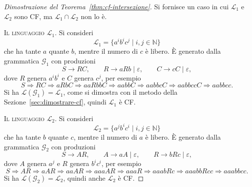 \documentclass[a4paper, 11pt, oneside]{book}
\theoremstyle{formale}
\begin{document}
    \begin{proof}[Dimostrazione del Teorema~\ref{thm:cf-intersezione}]
        Si fornisce un caso in cui $\mathcal{L}_1$ e $\mathcal{L}_2$ sono CF, ma
        $\mathcal{L}_1 \cap \mathcal{L}_2$ non lo \`e.

        \textsc{Il linguaggio $\mathcal{L}_1$}. Si consideri
        \begin{equation*}
            \mathcal{L}_1 = \{a^i b^i c^j \mid i, j \in \mathbb{N}\}
        \end{equation*}
        che ha tante $a$ quante $b$, mentre il numero di $c$ \`e libero. \`E generato dalla
        grammatica $\mathcal{G}_1$ con produzioni
        \begin{equation*}
            S \to RC, \qquad
            R \to aRb \mid \varepsilon, \qquad
            C \to cC \mid \varepsilon,
        \end{equation*}
        dove $R$ genera $a^i b^i$ e $C$ genera $c^j$, per esempio
        \begin{equation*}
            S \Rightarrow RC \Rightarrow aRbC \Rightarrow aaRbbC \Rightarrow aabbC
            \Rightarrow aabbcC \Rightarrow aabbccC \Rightarrow aabbcc.
        \end{equation*}
        Si ha $\mathcal{L}(\mathcal{G}_1) = \mathcal{L}_1$, come si dimostra con il metodo
        della Sezione~\ref{sec:dimostrare-cf}, quindi $\mathcal{L}_1$ \`e CF.

        \textsc{Il linguaggio $\mathcal{L}_2$}. Si consideri
        \begin{equation*}
            \mathcal{L}_2 = \{a^j b^i c^i \mid i, j \in \mathbb{N}\}
        \end{equation*}
        che ha tante $b$ quante $c$, mentre il numero di $a$ \`e libero. \`E generato dalla
        grammatica $\mathcal{G}_2$ con produzioni
        \begin{equation*}
            S \to AR, \qquad
            A \to aA \mid \varepsilon, \qquad
            R \to bRc \mid \varepsilon,
        \end{equation*}
        dove $A$ genera $a^j$ e $R$ genera $b^i c^i$, per esempio
        \begin{equation*}
            S \Rightarrow AR \Rightarrow aAR \Rightarrow aaAR \Rightarrow aaaAR
            \Rightarrow aaaR \Rightarrow aaabRc \Rightarrow aaabbRcc \Rightarrow aaabbcc.
        \end{equation*}
        Si ha $\mathcal{L}(\mathcal{G}_2) = \mathcal{L}_2$, quindi anche
        $\mathcal{L}_2$ \`e CF.


\end{proof}
\end{document}
